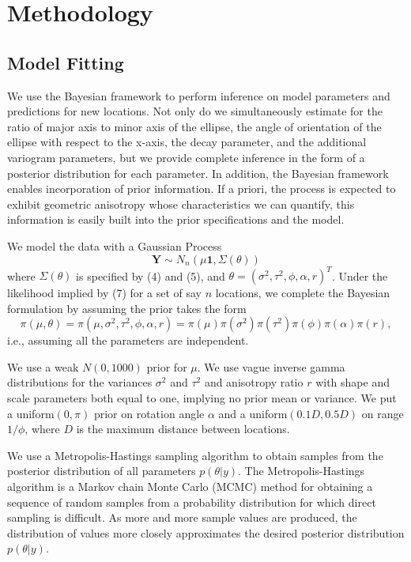 \documentclass[12pt,twoside]{dukestatscithesis}
\theoremstyle{definition}
\theoremstyle{definition}
\theoremstyle{definition}
\theoremstyle{remark}
\begin{document}
\chapter{Methodology}\label{methodology}

\section{Model Fitting}\label{model-fitting}

We use the Bayesian framework to perform inference on model parameters
and predictions for new locations. Not only do we simultaneously
estimate for the ratio of major axis to minor axis of the ellipse, the
angle of orientation of the ellipse with respect to the x-axis, the
decay parameter, and the additional variogram parameters, but we provide
complete inference in the form of a posterior distribution for each
parameter. In addition, the Bayesian framework enables incorporation of
prior information. If a priori, the process is expected to exhibit
geometric anisotropy whose characteristics we can quantify, this
information is easily built into the prior specifications and the model.

We model the data with a Gaussian Process
\begin{equation}
\textbf{Y} \sim N_n(\mu \textbf{1},  \Sigma(\theta))
\end{equation}
where \(\Sigma(\theta)\) is specified by (4) and (5), and
\(\theta = (\sigma^2, \tau^2, \phi, \alpha, r)^T\). Under the likelihood
implied by (7) for a set of say \(n\) locations, we complete the
Bayesian formulation by assuming the prior takes the form
\begin{equation}
\pi(\mu, \theta) = \pi(\mu, \sigma^2, \tau^2, \phi, \alpha, r) = \pi(\mu)\pi(\sigma^2)\pi(\tau^2)\pi(\phi)\pi(\alpha)\pi(r),
\end{equation}
i.e., assuming all the parameters are independent.

We use a weak \(N(0, 1000)\) prior for \(\mu\). We use vague inverse
gamma distributions for the variances \(\sigma^2\) and \(\tau^2\) and
anisotropy ratio \(r\) with shape and scale parameters both equal to
one, implying no prior mean or variance. We put a uniform\((0, \pi)\)
prior on rotation angle \(\alpha\) and a uniform\((0.1D, 0.5D)\) on
range \(1/\phi\), where \(D\) is the maximum distance between locations.

We use a Metropolis-Hastings sampling algorithm to obtain samples from
the posterior distribution of all parameters \(p(\theta|y)\). The
Metropolis-Hastings algorithm is a Markov chain Monte Carlo (MCMC)
method for obtaining a sequence of random samples from a probability
distribution for which direct sampling is difficult. As more and more
sample values are produced, the distribution of values more closely
approximates the desired posterior distribution \(p(\theta|y)\).
\end{document}
